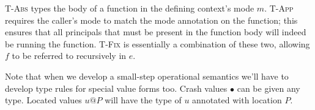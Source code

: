 \documentclass[10pt]{article}
\makeatletter
\newcommand{\rulelab}[1]{{\small \textsc{#1}}}
\newcommand{\kw}[1]{\ensuremath{\mathtt{#1}}}
\newcommand{\tnat}{\ensuremath{\mathtt{nat}}}
\newcommand{\elet}[3]{\ensuremath{\kw{let}~#1\, =\, #2~\kw{in}\;{#3}}}
\newcommand{\epar}[2]{\ensuremath{\kw{par}~{#1}~{#2}}}
\newcommand{\vloc}[2]{\ensuremath{{#1}\kw{@}{#2}}}
\newcommand{\vcrash}{\ensuremath{\bullet}}
\makeatother
\begin{document}

\rulelab{T-Abs} types the body of a function in the defining context's
mode $m$. \rulelab{T-App} requires the caller's mode to match the mode
annotation on the function; this ensures that all principals that must
be present in the function body will indeed be running the
function. \rulelab{T-Fix} is essentially a combination of these two,
allowing $f$ to be referred to recursively in $e$.

Note that when we develop a small-step operational semantics we'll
have to develop type rules for special value forms too. Crash values
$\vcrash$ can be given any type. Located values $\vloc{u}{P}$ will
have the type of $u$ annotated with location $P$.
\end{document}
